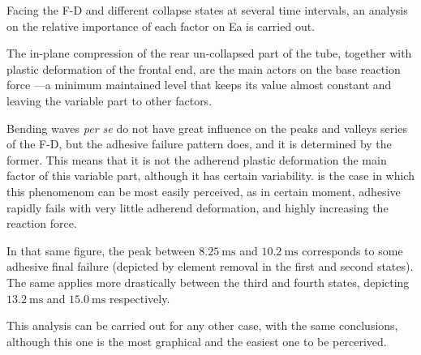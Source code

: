 \documentclass[
documentsize = a4, %
font = cmr, %
typesize = 11, %
printmode = true,
onehalfspacing = true,
language = en, %
titlepage = udciccp, %
degree = pt, %
dedication = true,
acknowledgements = true,
abstract-en = true,
abstract-es = false,
abstract-ga = false,
epigraphs = true,
toc = true,
lof = true,
lot = true,
frontmatterintoc = false,
notation = false,
minimal = false,
]{UDCthesis}
\begin{document}
Facing the \gls{F-D} and different collapse states at several time intervals, an analysis on the relative importance of each factor on \gls{Ea} is carried out.

The in-plane compression of the rear un-collapsed part of the tube, together with plastic deformation of the frontal end, are the main actors on the base reaction force ---a minimum maintained level that keeps its value almost constant and leaving the variable part to other factors.

Bending waves \textit{per se} do not have great influence on the peaks and valleys series of the \gls{F-D}, but the adhesive failure pattern does, and it is determined by the former. This means that it is not the adherend plastic deformation the main factor of this variable part, although it has certain variability.  is the case in which this phenomenom can be most easily perceived, as in certain moment, adhesive rapidly fails with very little adherend deformation, and highly increasing the reaction force.

In that same figure, the peak between $\SI{8.25}{\ms}$ and $\SI{10.2}{\ms}$ corresponds to some adhesive final failure (depicted by element removal in the first and second states). The same applies more drastically between the third and fourth states, depicting $\SI{13.2}{\ms}$ and $\SI{15.0}{\ms}$ respectively.

This analysis can be carried out for any other case, with the same conclusions, although this one is the most graphical and the easiest one to be percerived.
\end{document}
